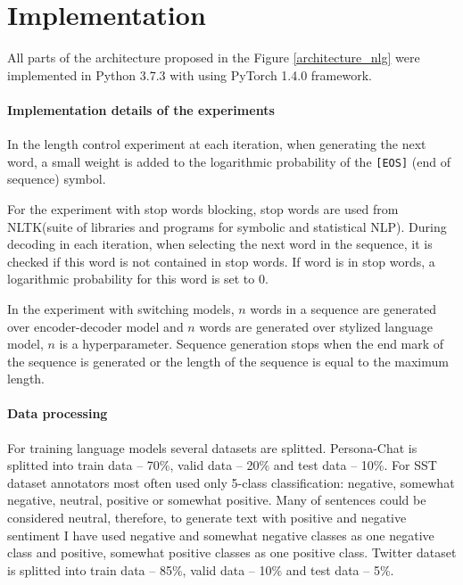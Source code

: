 \chapter{Implementation} \label{implementation}
All parts of the architecture proposed in the Figure \ref{architecture_nlg} were implemented in Python 3.7.3 with using PyTorch 1.4.0 framework.

\subsubsection{Implementation details of the experiments}
In the length control experiment at each iteration, when generating the next word, a small weight is added to the logarithmic probability of the \texttt{[EOS]} (end of sequence) symbol. 

For the experiment with stop words blocking, stop words are used from NLTK\protect\footnotemark (suite of libraries and programs for symbolic and statistical NLP). During decoding in each iteration, when selecting the next word in the sequence, it is checked if this word is not contained in stop words. If word is in stop words, a logarithmic probability for this word is set to 0. 

In the experiment with switching models, $n$ words in a sequence are generated over encoder-decoder model and $n$ words are generated over stylized language model, $n$ is a hyperparameter. Sequence generation stops when the end mark of the sequence is generated or the length of the sequence is equal to the maximum length. 


\subsubsection{Data processing}
For training language models several datasets are splitted. Persona-Chat is splitted into train data -- 70\%, valid data -- 20\% and test data -- 10\%. For SST dataset annotators most often used only 5-class classification: negative, somewhat negative, neutral, positive or somewhat positive. Many of sentences could be considered neutral, therefore, to generate text with positive and negative sentiment I have used negative and somewhat negative classes as one negative class and positive, somewhat positive classes as one positive class. Twitter dataset is splitted into train data -- 85\%, valid data -- 10\% and test data -- 5\%.

